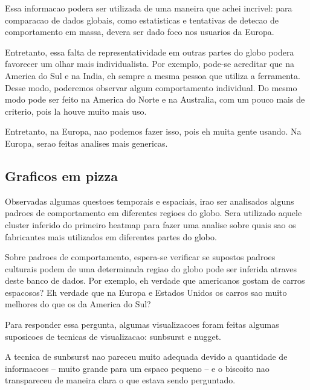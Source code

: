 \documentclass[10pt, conference]{IEEEtran}
\begin{document}
Essa informacao podera ser utilizada de uma maneira que achei incrivel: para comparacao de
dados globais, como estatisticas e tentativas de detecao de comportamento em massa, devera
ser dado foco nos usuarios da Europa.

Entretanto, essa falta de representatividade em outras partes do globo podera favorecer um
olhar mais individualista. Por exemplo, pode-se acreditar que na America do Sul e na India,
eh sempre a mesma pessoa que utiliza a ferramenta. Desse modo, poderemos observar algum
comportamento individual. Do mesmo modo pode ser feito na America do Norte e na Australia,
com um pouco mais de criterio, pois la houve muito mais uso.

Entretanto, na Europa, nao podemos fazer isso, pois eh muita gente usando. Na Europa, serao
feitas analises mais genericas.




\subsection{Graficos em pizza}

Observadas algumas questoes temporais e espaciais, irao ser analisados alguns padroes de comportamento
em diferentes regioes do globo. Sera utilizado aquele cluster inferido do primeiro heatmap para
fazer uma analise sobre quais sao os fabricantes mais utilizados em diferentes partes do globo.

Sobre padroes de comportamento, espera-se verificar se supostos padroes culturais podem de uma determinada
regiao do globo pode ser inferida atraves deste banco de dados. Por exemplo, eh verdade que americanos
gostam de carros espacosos? Eh verdade que na Europa e Estados Unidos os carros sao muito melhores
do que os da America do Sul?

Para responder essa pergunta, algumas visualizacoes foram feitas algumas suposicoes de tecnicas
de visualizacao: sunbsurst e nugget. 

A tecnica de sunbsurst nao pareceu muito adequada devido a quantidade de informacoes -- muito grande para
um espaco pequeno -- e o biscoito nao transpareceu de maneira clara o que estava sendo perguntado.
\end{document}
